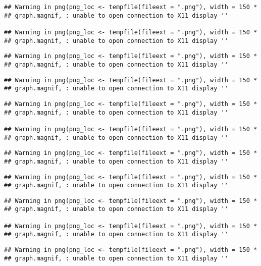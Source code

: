 \documentclass[]{article}
\begin{document}
\begin{verbatim}
## Warning in png(png_loc <- tempfile(fileext = ".png"), width = 150 *
## graph.magnif, : unable to open connection to X11 display ''

## Warning in png(png_loc <- tempfile(fileext = ".png"), width = 150 *
## graph.magnif, : unable to open connection to X11 display ''
\end{verbatim}

\begin{verbatim}
## Warning in png(png_loc <- tempfile(fileext = ".png"), width = 150 *
## graph.magnif, : unable to open connection to X11 display ''
\end{verbatim}

\begin{verbatim}
## Warning in png(png_loc <- tempfile(fileext = ".png"), width = 150 *
## graph.magnif, : unable to open connection to X11 display ''
\end{verbatim}

\begin{verbatim}
## Warning in png(png_loc <- tempfile(fileext = ".png"), width = 150 *
## graph.magnif, : unable to open connection to X11 display ''

## Warning in png(png_loc <- tempfile(fileext = ".png"), width = 150 *
## graph.magnif, : unable to open connection to X11 display ''
\end{verbatim}

\begin{verbatim}
## Warning in png(png_loc <- tempfile(fileext = ".png"), width = 150 *
## graph.magnif, : unable to open connection to X11 display ''
\end{verbatim}

\begin{verbatim}
## Warning in png(png_loc <- tempfile(fileext = ".png"), width = 150 *
## graph.magnif, : unable to open connection to X11 display ''
\end{verbatim}

\begin{verbatim}
## Warning in png(png_loc <- tempfile(fileext = ".png"), width = 150 *
## graph.magnif, : unable to open connection to X11 display ''

## Warning in png(png_loc <- tempfile(fileext = ".png"), width = 150 *
## graph.magnif, : unable to open connection to X11 display ''
\end{verbatim}

\begin{verbatim}
## Warning in png(png_loc <- tempfile(fileext = ".png"), width = 150 *
## graph.magnif, : unable to open connection to X11 display ''
\end{verbatim}
\end{document}
